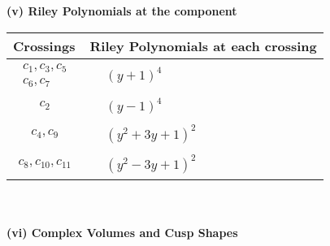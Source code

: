 \documentclass[1p]{elsarticle_modified}
\theoremstyle{definition}
\begin{document}
\newpage\renewcommand{\arraystretch}{1}
\flushleft \textbf{(v) Riley Polynomials at the component}\newline \\
\begin{tabular}{m{50pt}|m{274pt}}
Crossings & \hspace{64pt}Riley Polynomials at each crossing \\
\hline $$\begin{aligned}c_{1},c_{3},c_{5}\\c_{6},c_{7}\end{aligned}$$&$\begin{aligned}
&(y+1)^4
\end{aligned}$\\
\hline $$\begin{aligned}c_{2}\end{aligned}$$&$\begin{aligned}
&(y-1)^4
\end{aligned}$\\
\hline $$\begin{aligned}c_{4},c_{9}\end{aligned}$$&$\begin{aligned}
&(y^2+3 y+1)^2
\end{aligned}$\\
\hline $$\begin{aligned}c_{8},c_{10},c_{11}\end{aligned}$$&$\begin{aligned}
&(y^2-3 y+1)^2
\end{aligned}$\\
\hline
\end{tabular}\\~\\
\newpage\flushleft \textbf{(vi) Complex Volumes and Cusp Shapes}
\end{document}
